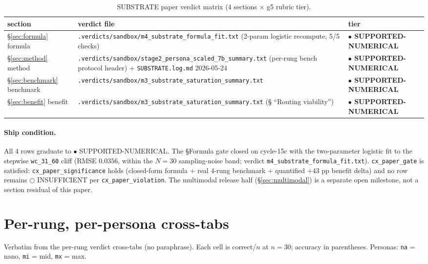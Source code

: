 \documentclass[11pt,a4paper]{article}
\newcommand{\green}[1]{\textcolor{green!50!black}{\textbf{#1}}}
\newcommand{\vfile}[1]{\texttt{.verdicts/sandbox/#1}}
\begin{document}
\begin{table}[h]
\centering
\caption{SUBSTRATE paper verdict matrix (4 sections \(\times\) g5 rubric tier).}
\begin{tabular}{lll}
\toprule
section & verdict file & tier \\
\midrule
\S\ref{sec:formula} formula        & \vfile{m4\_substrate\_formula\_fit.txt} (2-param logistic recompute, 5/5 checks) & \green{$\bullet$ SUPPORTED-NUMERICAL} \\
\S\ref{sec:method} method          & \vfile{stage2\_persona\_scaled\_7b\_summary.txt} (per-rung bench protocol header) + \texttt{SUBSTRATE.log.md} 2026-05-24 & \green{$\bullet$ SUPPORTED-NUMERICAL} \\
\S\ref{sec:benchmark} benchmark    & \vfile{m3\_substrate\_saturation\_summary.txt} & \green{$\bullet$ SUPPORTED-NUMERICAL} \\
\S\ref{sec:benefit} benefit        & \vfile{m3\_substrate\_saturation\_summary.txt} (§ ``Routing viability'') & \green{$\bullet$ SUPPORTED-NUMERICAL} \\
\bottomrule
\end{tabular}
\end{table}

\paragraph{Ship condition.} All 4 rows graduate to \(\bullet\)
SUPPORTED-NUMERICAL. The §Formula gate closed on cycle-15c with the
two-parameter logistic fit to the stepwise \texttt{wc\_31\_60} cliff (RMSE
\(0.0356\), within the \(N{=}30\) sampling-noise band; verdict
\texttt{m4\_substrate\_formula\_fit.txt}). \texttt{cx\_paper\_gate} is
satisfied: \texttt{cx\_paper\_significance} holds (closed-form formula
\(+\) real 4-rung benchmark \(+\) quantified \(+43\) pp benefit delta) and no
row remains \(\bigcirc\) INSUFFICIENT per \texttt{cx\_paper\_violation}. The
multimodal release half (§\ref{sec:multimodal}) is a separate open milestone,
not a section residual of this paper.

\appendix
\section{Per-rung, per-persona cross-tabs}
\label{app:perrung}
Verbatim from the per-rung verdict cross-tabs (no paraphrase). Each cell is
correct/\(n\) at \(n{=}30\); accuracy in parentheses. Personas: \texttt{na} =
nano, \texttt{mi} = mid, \texttt{mx} = max.
\end{document}
